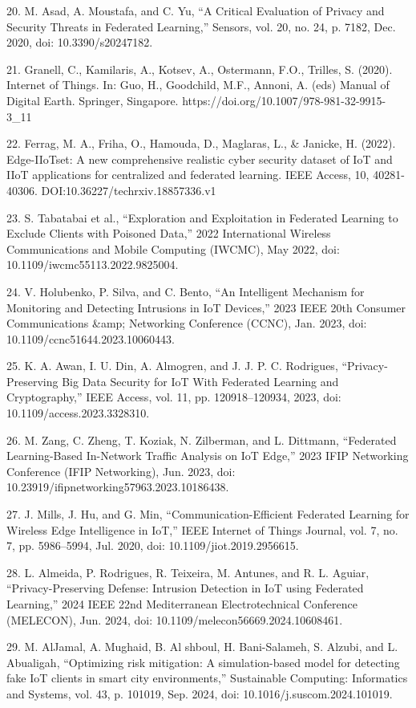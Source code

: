 20. M. Asad, A. Moustafa, and C. Yu, ``A Critical Evaluation of Privacy
and Security Threats in Federated Learning,'' Sensors, vol. 20, no. 24,
p. 7182, Dec. 2020, doi: 10.3390/s20247182.

21. Granell, C., Kamilaris, A., Kotsev, A., Ostermann, F.O., Trilles, S.
(2020). Internet of Things. In: Guo, H., Goodchild, M.F., Annoni, A.
(eds) Manual of Digital Earth. Springer, Singapore.
https://doi.org/10.1007/978-981-32-9915-3\_11

22. Ferrag, M. A., Friha, O., Hamouda, D., Maglaras, L., \& Janicke, H.
(2022). Edge-IIoTset: A new comprehensive realistic cyber security
dataset of IoT and IIoT applications for centralized and federated
learning. IEEE Access, 10, 40281-40306.
DOI:10.36227/techrxiv.18857336.v1

23. S. Tabatabai et al., ``Exploration and Exploitation in Federated
Learning to Exclude Clients with Poisoned Data,'' 2022 International
Wireless Communications and Mobile Computing (IWCMC), May 2022, doi:
10.1109/iwcmc55113.2022.9825004.

24. V. Holubenko, P. Silva, and C. Bento, ``An Intelligent Mechanism for
Monitoring and Detecting Intrusions in IoT Devices,'' 2023 IEEE 20th
Consumer Communications \&amp; Networking Conference (CCNC), Jan. 2023,
doi: 10.1109/ccnc51644.2023.10060443.

25. K. A. Awan, I. U. Din, A. Almogren, and J. J. P. C. Rodrigues,
``Privacy-Preserving Big Data Security for IoT With Federated Learning
and Cryptography,'' IEEE Access, vol. 11, pp. 120918--120934, 2023, doi:
10.1109/access.2023.3328310.

26. M. Zang, C. Zheng, T. Koziak, N. Zilberman, and L. Dittmann,
``Federated Learning-Based In-Network Traffic Analysis on IoT Edge,''
2023 IFIP Networking Conference (IFIP Networking), Jun. 2023, doi:
10.23919/ifipnetworking57963.2023.10186438.

27. J. Mills, J. Hu, and G. Min, ``Communication-Efficient Federated
Learning for Wireless Edge Intelligence in IoT,'' IEEE Internet of
Things Journal, vol. 7, no. 7, pp. 5986--5994, Jul. 2020, doi:
10.1109/jiot.2019.2956615.

28. L. Almeida, P. Rodrigues, R. Teixeira, M. Antunes, and R. L. Aguiar,
``Privacy-Preserving Defense: Intrusion Detection in IoT using Federated
Learning,'' 2024 IEEE 22nd Mediterranean Electrotechnical Conference
(MELECON), Jun. 2024, doi: 10.1109/melecon56669.2024.10608461.

29. M. AlJamal, A. Mughaid, B. Al shboul, H. Bani-Salameh, S. Alzubi,
and L. Abualigah, ``Optimizing risk mitigation: A simulation-based model
for detecting fake IoT clients in smart city environments,'' Sustainable
Computing: Informatics and Systems, vol. 43, p. 101019, Sep. 2024, doi:
10.1016/j.suscom.2024.101019.

